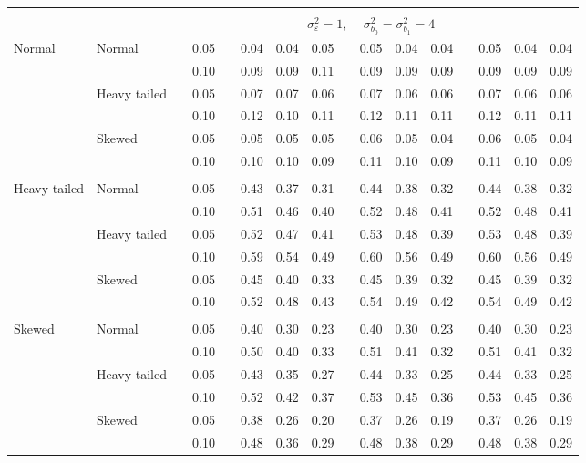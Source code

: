 \documentclass[12pt]{article} %
\begin{document}
\begin{table}[ht]
\begin{scriptsize}
\begin{center}
\begin{tabular}{ll p{.1cm} c p{.1cm} rrr p{.1cm} rrr p{.1cm} rrr}
&&&&&&&&&&&&&&&\\
& && && \multicolumn{9}{c}{$\sigma_{\varepsilon}^2 = 1$, \ \ $\sigma_{b_0}^2 = \sigma_{b_1}^2 = 4$} \\ \cline{6-16}
\rowcolor{gray!20}Normal       & Normal       && 0.05 &&   0.04 & 0.04 & 0.05 && 0.05 & 0.04 & 0.04 && 0.05 & 0.04 & 0.04 \\ 
\rowcolor{gray!20}             &              && 0.10 &&   0.09 & 0.09 & 0.11 && 0.09 & 0.09 & 0.09 && 0.09 & 0.09 & 0.09 \\ 
\rowcolor{gray!20}             & Heavy tailed && 0.05 &&   0.07 & 0.07 & 0.06 && 0.07 & 0.06 & 0.06 && 0.07 & 0.06 & 0.06 \\ 
\rowcolor{gray!20}             &              && 0.10 &&   0.12 & 0.10 & 0.11 && 0.12 & 0.11 & 0.11 && 0.12 & 0.11 & 0.11 \\ 
\rowcolor{gray!20}             & Skewed       && 0.05 &&   0.05 & 0.05 & 0.05 && 0.06 & 0.05 & 0.04 && 0.06 & 0.05 & 0.04 \\ 
\rowcolor{gray!20}             &              && 0.10 &&   0.10 & 0.10 & 0.09 && 0.11 & 0.10 & 0.09 && 0.11 & 0.10 & 0.09 \\ 
             &&&&&&&&&&&&&&&\\
Heavy tailed & Normal       && 0.05 &&   0.43 & 0.37 & 0.31 && 0.44 & 0.38 & 0.32 && 0.44 & 0.38 & 0.32 \\ 
             &              && 0.10 &&   0.51 & 0.46 & 0.40 && 0.52 & 0.48 & 0.41 && 0.52 & 0.48 & 0.41 \\ 
             & Heavy tailed && 0.05 &&   0.52 & 0.47 & 0.41 && 0.53 & 0.48 & 0.39 && 0.53 & 0.48 & 0.39 \\ 
             &              && 0.10 &&   0.59 & 0.54 & 0.49 && 0.60 & 0.56 & 0.49 && 0.60 & 0.56 & 0.49 \\ 
             & Skewed       && 0.05 &&   0.45 & 0.40 & 0.33 && 0.45 & 0.39 & 0.32 && 0.45 & 0.39 & 0.32 \\ 
             &              && 0.10 &&   0.52 & 0.48 & 0.43 && 0.54 & 0.49 & 0.42 && 0.54 & 0.49 & 0.42 \\ 
             &&&&&&&&&&&&&&&\\
Skewed       & Normal       && 0.05 &&   0.40 & 0.30 & 0.23 && 0.40 & 0.30 & 0.23 && 0.40 & 0.30 & 0.23 \\ 
             &              && 0.10 &&   0.50 & 0.40 & 0.33 && 0.51 & 0.41 & 0.32 && 0.51 & 0.41 & 0.32 \\ 
             & Heavy tailed && 0.05 &&   0.43 & 0.35 & 0.27 && 0.44 & 0.33 & 0.25 && 0.44 & 0.33 & 0.25 \\ 
             &              && 0.10 &&   0.52 & 0.42 & 0.37 && 0.53 & 0.45 & 0.36 && 0.53 & 0.45 & 0.36 \\ 
             & Skewed       && 0.05 &&   0.38 & 0.26 & 0.20 && 0.37 & 0.26 & 0.19 && 0.37 & 0.26 & 0.19 \\ 
             &              && 0.10 &&   0.48 & 0.36 & 0.29 && 0.48 & 0.38 & 0.29 && 0.48 & 0.38 & 0.29 \\ 



\end{tabular}
\end{center}
\end{scriptsize}
\end{table}
\end{document}

